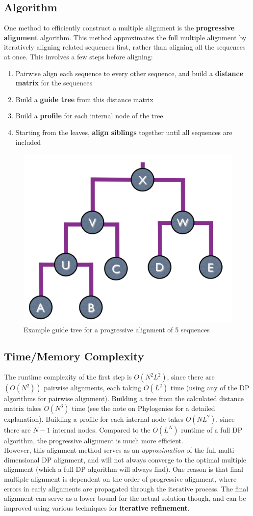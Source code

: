 \documentclass[12pt]{article}
\begin{document}
\subsection{Algorithm}
One method to efficiently construct a multiple alignment is the \textbf{progressive alignment} algorithm. This method approximates the full multiple alignment by iteratively aligning related sequences first, rather than aligning all the sequences at once. This involves a few steps before aligning:
\begin{enumerate}
    \item Pairwise align each sequence to every other sequence, and build a \textbf{distance matrix} for the sequences
    \item Build a \textbf{guide tree} from this distance matrix
    \item Build a \textbf{profile} for each internal node of the tree
    \item Starting from the leaves, \textbf{align siblings} together until all sequences are included
\end{enumerate}
\begin{figure}[h]
    \centering
    \includegraphics[width = .5\linewidth]{tree.png}
    \caption{Example guide tree for a progressive alignment of 5 sequences}
    \label{fig:tree}
\end{figure}
\subsection{Time/Memory Complexity}
The runtime complexity of the first step is $O(N^2L^2)$, since there are $(O(N^2))$ pairwise alignments, each taking $O(L^2)$ time (using any of the DP algorithms for pairwise alignment). Building a tree from the calculated distance matrix takes $O(N^3)$ time (see the note on Phylogenies for a detailed explanation). Building a profile for each internal node takes $O(NL^2)$, since there are $N-1$ internal nodes. Compared to the $O(L^N)$ runtime of a full DP algorithm, the progressive alignment is much more efficient.\\[10pt]
However, this alignment method serves as an \textit{approximation} of the full multi-dimensional DP alignment, and will not always converge to the optimal multiple alignment (which a full DP algorithm will always find). One reason is that final multiple alignment is dependent on the order of progressive alignment, where errors in early alignments are propagated through the iterative process. The final alignment can serve as a lower bound for the actual solution though, and can be improved using various techniques for \textbf{iterative refinement}.
\end{document}
